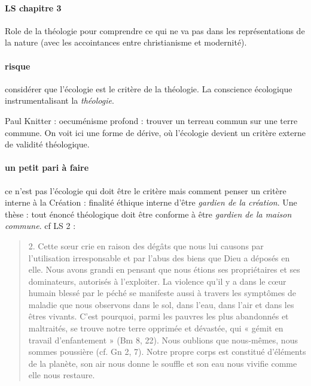 \paragraph{LS chapitre 3} Role de la théologie pour comprendre ce qui ne va pas dans les représentations de la nature (avec les accointances entre christianisme et modernité). 
\paragraph{risque} considérer que l'écologie est le critère de la théologie. La conscience écologique instrumentalisant la \textit{théologie}.

Paul Knitter : oecuménisme profond : trouver un terreau commun sur une terre commune. On voit ici une forme de dérive, où l'écologie devient un critère externe de validité théologique.

\paragraph{un petit pari à faire} ce n'est pas l'écologie qui doit être le critère mais comment penser un critère interne à la Création : finalité éthique interne d'être \textit{gardien de la création}. Une thèse : tout énoncé théologique doit être conforme à être \textit{gardien de la maison commune}. cf LS 2 : 
\begin{quote}
    2. Cette sœur crie en raison des dégâts que nous lui causons par l’utilisation irresponsable et par l’abus des biens que Dieu a déposés en elle. Nous avons grandi en pensant que nous étions ses propriétaires et ses dominateurs, autorisés à l’exploiter. La violence qu’il y a dans le cœur humain blessé par le péché se manifeste aussi à travers les symptômes de maladie que nous observons dans le sol, dans l’eau, dans l’air et dans les êtres vivants. C’est pourquoi, parmi les pauvres les plus abandonnés et maltraités, se trouve notre terre opprimée et dévastée, qui « gémit en travail d’enfantement » (Bm 8, 22). Nous oublions que nous-mêmes, nous sommes poussière (cf. Gn 2, 7). Notre propre corps est constitué d’éléments de la planète, son air nous donne le souffle et son eau nous vivifie comme elle nous restaure.
\end{quote}

